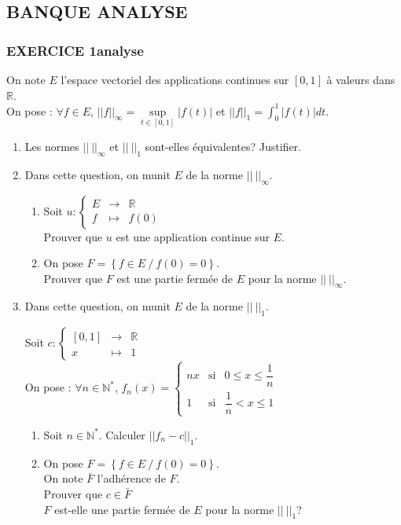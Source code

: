 \documentclass[10pt,oneside]{article}
\begin{document}
\pagebreak
\begin{flushleft}

\part*{BANQUE ANALYSE}

\section*{EXERCICE 1\:analyse  }

On note $E$ l'espace vectoriel des applications continues sur $\left[ 0,1\right]$ à valeurs dans $\mathbb{R}$.\\
On pose : $\forall f\in E$,  $||f||_{\infty}=\underset{t\in \left[ 0,1\right] }{\sup}|f(t)|$ et $||f||_{1}=\displaystyle\int_{0}^{1}|f(t)|dt$.
\begin{enumerate}
\item
Les normes $||\:||_{\infty}$ et $||\:||_{1}$ sont-elles équivalentes? Justifier.
\item
Dans cette question, on munit $E$ de la norme $||\:||_{\infty}$.
\begin{enumerate}
\item
Soit $u:\left\lbrace \begin{array}{lll}
E&\longrightarrow& \mathbb{R}\\
f&\longmapsto& f(0)
\end{array}
\right. $\\
Prouver que $u$ est une application continue sur $E$.\:\:\:\:
\item
On pose $F=\left\lbrace  f\in E\:/\: f(0)=0\right\rbrace$.\\
Prouver que $F$ est une partie fermée de $E$  pour la norme $||\:||_{\infty}$.

\end{enumerate}
\item
Dans cette question, on munit $E$ de la norme $||\:||_{1}$.


Soit $c:\left\lbrace \begin{array}{lll}
\left[0,1 \right] &\longrightarrow& \mathbb{R}\\
x&\longmapsto& 1
\end{array}
\right. $\\
\medskip
On pose : $\forall n\in \mathbb{N}^{*}$, $f_n(x)=\left\lbrace \begin{array}{lll}
nx& \text{si}& 0\leqslant x\leqslant \dfrac{1}{n}\\
1&\text{si}& \dfrac{1}{n}< x\leqslant 1
\end{array}\right. $
\begin{enumerate}
\item
Soit $n\in \mathbb{N}^{*}$. Calculer $||f_n-c||_{1}$.
\item
On pose $F=\left\lbrace  f\in E\:/\: f(0)=0\right\rbrace$.\\
On note $\bar{F}$ l'adhérence de $F$.\\
Prouver que $c\in \bar{F}$\\
$F$ est-elle une partie fermée de $E$ pour la norme $||\:||_{1}$? 
\end{enumerate}
\end{enumerate}



\end{flushleft}
\end{document}
